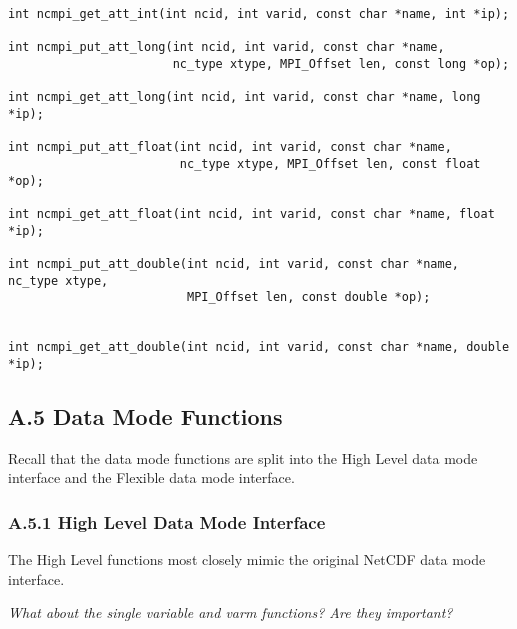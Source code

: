 \documentclass[10pt]{article}
\begin{document}
\begin{verbatim}
int ncmpi_get_att_int(int ncid, int varid, const char *name, int *ip);

int ncmpi_put_att_long(int ncid, int varid, const char *name,
                       nc_type xtype, MPI_Offset len, const long *op);

int ncmpi_get_att_long(int ncid, int varid, const char *name, long *ip);

int ncmpi_put_att_float(int ncid, int varid, const char *name,
                        nc_type xtype, MPI_Offset len, const float *op);

int ncmpi_get_att_float(int ncid, int varid, const char *name, float *ip);

int ncmpi_put_att_double(int ncid, int varid, const char *name, nc_type xtype,
                         MPI_Offset len, const double *op);


int ncmpi_get_att_double(int ncid, int varid, const char *name, double *ip);
\end{verbatim}
%
%
\subsection*{A.5  Data Mode Functions}

Recall that the data mode functions are split into the High Level data mode interface and the
Flexible data mode interface.

\subsubsection*{A.5.1  High Level Data Mode Interface}

The High Level functions most closely mimic the original NetCDF data mode interface.

\emph{What about the single variable and varm functions?  Are they important?}
\end{document}
